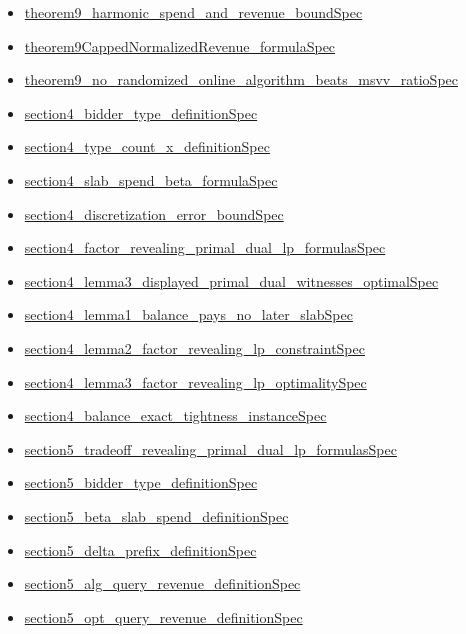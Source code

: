 \documentclass[10pt]{article}
\begin{document}
\begin{itemize}[leftmargin=1.2em]
\begin{itemize}[leftmargin=1.2em]
\item \hyperlink{source-claim-264773c8f10d4b54}{theorem9\_harmonic\_spend\_and\_revenue\_boundSpec}
\item \hyperlink{source-claim-6addec2cb6646978}{theorem9CappedNormalizedRevenue\_formulaSpec}
\item \hyperlink{source-claim-5b0fcfe8e1bd2a2c}{theorem9\_no\_randomized\_online\_algorithm\_beats\_msvv\_ratioSpec}
\item \hyperlink{source-claim-b801ff921ee99322}{section4\_bidder\_type\_definitionSpec}
\item \hyperlink{source-claim-3596aa5518094920}{section4\_type\_count\_x\_definitionSpec}
\item \hyperlink{source-claim-f6228eecafce362c}{section4\_slab\_spend\_beta\_formulaSpec}
\item \hyperlink{source-claim-cde484128ac64433}{section4\_discretization\_error\_boundSpec}
\item \hyperlink{source-claim-fbfc9585e50c9fbc}{section4\_factor\_revealing\_primal\_dual\_lp\_formulasSpec}
\item \hyperlink{source-claim-ac21de0a185f67c8}{section4\_lemma3\_displayed\_primal\_dual\_witnesses\_optimalSpec}
\item \hyperlink{source-claim-dfccb19a7f8aa7cf}{section4\_lemma1\_balance\_pays\_no\_later\_slabSpec}
\item \hyperlink{source-claim-43d0467a1c6009b2}{section4\_lemma2\_factor\_revealing\_lp\_constraintSpec}
\item \hyperlink{source-claim-4d16e2c525e48fa8}{section4\_lemma3\_factor\_revealing\_lp\_optimalitySpec}
\item \hyperlink{source-claim-3618f9ae86915bdc}{section4\_balance\_exact\_tightness\_instanceSpec}
\item \hyperlink{source-claim-a55d8cca7098cedb}{section5\_tradeoff\_revealing\_primal\_dual\_lp\_formulasSpec}
\item \hyperlink{source-claim-cb690fe905e1b34b}{section5\_bidder\_type\_definitionSpec}
\item \hyperlink{source-claim-4b12d3a25d5696f4}{section5\_beta\_slab\_spend\_definitionSpec}
\item \hyperlink{source-claim-1983055f1d839de7}{section5\_delta\_prefix\_definitionSpec}
\item \hyperlink{source-claim-d8b1335948eb558d}{section5\_alg\_query\_revenue\_definitionSpec}
\item \hyperlink{source-claim-31ab02701985c388}{section5\_opt\_query\_revenue\_definitionSpec}

\end{itemize}
\end{itemize}
\end{document}

